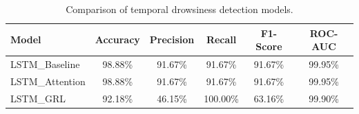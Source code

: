 \begin{table}[htbp]
\centering
\caption{Comparison of temporal drowsiness detection models.}
\label{tab:model_comparison}
\begin{tabular}{lccccc}
\hline
Model & Accuracy & Precision & Recall & F1-Score & ROC-AUC \\
\hline
LSTM\_Baseline & 98.88\% & 91.67\% & 91.67\% & 91.67\% & 99.95\% \\
LSTM\_Attention & 98.88\% & 91.67\% & 91.67\% & 91.67\% & 99.95\% \\
LSTM\_GRL & 92.18\% & 46.15\% & 100.00\% & 63.16\% & 99.90\% \\
\hline
\end{tabular}
\end{table}